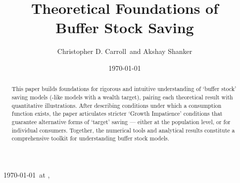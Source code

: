 \documentclass[BufferStockTheory]{subfiles}
\begin{document}


\hfill{\tiny \jobname~\today~{at} \DTMcurrenttime, ~~}

\title{Theoretical Foundations of \\ Buffer Stock Saving}

\author{Christopher D. Carroll\authNum ~and Akshay Shanker\authNum}



\date{\today}

\maketitle
\hypertarget{abstract}{}
\begin{abstract}
  This paper builds foundations for rigorous and intuitive understanding of `buffer stock' saving models (\cite{bewleyPIH}-like models with a wealth target), pairing each theoretical result with quantitative illustrations.  After describing conditions under which a consumption function exists, the paper articulates stricter `Growth Impatience' conditions that guarantee alternative forms of `target' saving --- either at the population level, or for individual consumers.  Together, the numerical tools and analytical results constitute a comprehensive toolkit for understanding buffer stock models.
\end{abstract}

\hypertarget{links}{}
\end{document}
